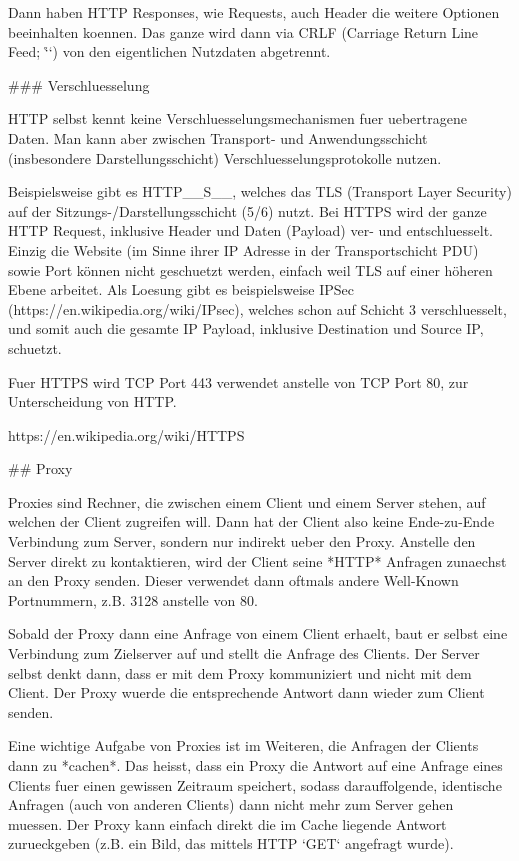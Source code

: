 Dann haben HTTP Responses, wie Requests, auch Header die weitere Optionen
beeinhalten koennen. Das ganze wird dann via CRLF (Carriage Return Line Feed;
`\r\n`) von den eigentlichen Nutzdaten abgetrennt.

### Verschluesselung

HTTP selbst kennt keine Verschluesselungsmechanismen fuer uebertragene
Daten. Man kann aber zwischen Transport- und Anwendungsschicht (insbesondere
Darstellungsschicht) Verschluesselungsprotokolle nutzen.

Beispielsweise gibt es HTTP__S__, welches das TLS (Transport Layer Security) auf
der Sitzungs-/Darstellungsschicht (5/6) nutzt. Bei HTTPS wird der ganze HTTP
Request, inklusive Header und Daten (Payload) ver- und entschluesselt. Einzig
die Website (im Sinne ihrer IP Adresse in der Transportschicht PDU) sowie Port
können nicht geschuetzt werden, einfach weil TLS auf einer höheren Ebene
arbeitet. Als Loesung gibt es beispielsweise IPSec
(https://en.wikipedia.org/wiki/IPsec), welches schon auf Schicht 3
verschluesselt, und somit auch die gesamte IP Payload, inklusive Destination und
Source IP, schuetzt.

Fuer HTTPS wird TCP Port 443 verwendet anstelle von TCP Port 80, zur
Unterscheidung von HTTP.

https://en.wikipedia.org/wiki/HTTPS

## Proxy

Proxies sind Rechner, die zwischen einem Client und einem Server stehen, auf
welchen der Client zugreifen will. Dann hat der Client also keine Ende-zu-Ende
Verbindung zum Server, sondern nur indirekt ueber den Proxy. Anstelle den
Server direkt zu kontaktieren, wird der Client seine *HTTP* Anfragen zunaechst
an den Proxy senden. Dieser verwendet dann oftmals andere Well-Known
Portnummern, z.B. 3128 anstelle von 80.

Sobald der Proxy dann eine Anfrage von einem Client erhaelt, baut er selbst eine
Verbindung zum Zielserver auf und stellt die Anfrage des Clients. Der Server
selbst denkt dann, dass er mit dem Proxy kommuniziert und nicht mit dem
Client. Der Proxy wuerde die entsprechende Antwort dann wieder zum Client
senden.

Eine wichtige Aufgabe von Proxies ist im Weiteren, die Anfragen der Clients dann
zu *cachen*. Das heisst, dass ein Proxy die Antwort auf eine Anfrage eines
Clients fuer einen gewissen Zeitraum speichert, sodass darauffolgende,
identische Anfragen (auch von anderen Clients) dann nicht mehr zum Server gehen
muessen. Der Proxy kann einfach direkt die im Cache liegende Antwort
zurueckgeben (z.B. ein Bild, das mittels HTTP `GET` angefragt wurde).

